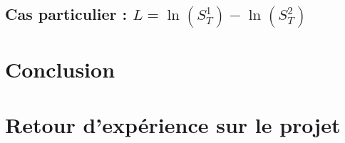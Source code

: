 \documentclass[11pt,letterpaper]{article}
\begin{document}
\subsection{Cas particulier : $L = \ln \left( S_T^{1} \right) - \ln \left( S_T^{2} \right)$}



\pagebreak
\section{Conclusion}


\pagebreak
\section{Retour d'expérience sur le projet}


\pagebreak
\nocite{*}


\end{document}

